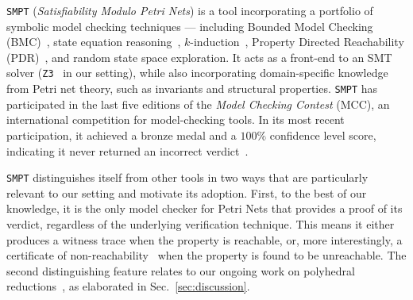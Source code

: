 \texttt{SMPT} (\emph{Satisfiability Modulo Petri Nets}) is a tool incorporating a portfolio of symbolic model checking techniques --- including Bounded Model Checking (BMC)~\cite{BiCiClZh99}, state equation reasoning~\cite{Mu77}, $k$-induction~\cite{ShSiSt20}, Property Directed Reachability (PDR)~\cite{Br11,AmDaHu22}, and random state space exploration. It acts as a front-end to an SMT solver (\texttt{Z3}~\cite{DeBj08} in our setting), while also incorporating domain-specific knowledge from Petri net theory, such as invariants and structural properties. \texttt{SMPT} has participated in the last five editions of the \textit{Model Checking Contest} (MCC), an international competition for model-checking tools. In its most recent participation, it achieved a bronze medal and a $100\%$ confidence level score, indicating it never returned an incorrect verdict~\cite{mcc:2025}.

\texttt{SMPT} distinguishes itself from other tools in two ways that are particularly relevant to our setting and motivate its adoption. First, to the best of our knowledge, it is the only model checker for Petri Nets that provides a proof of its verdict, regardless of the underlying verification technique. This means it either produces a witness trace when the property is reachable, or, more interestingly, a certificate of non-reachability~\cite{AmDaHu22} when the property is found to be unreachable.
%
The second distinguishing feature relates to our ongoing work on polyhedral reductions~\cite{AmBeDa21}, as elaborated in Sec.~\ref{sec:discussion}.



